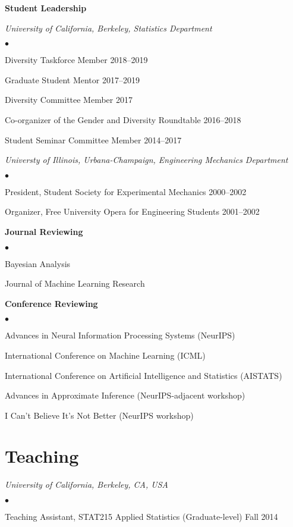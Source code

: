 \documentclass[margin,line]{res}
\newenvironment{list2}{
  \begin{list}{$\bullet$}{%
      \setlength{\itemsep}{0in}
      \setlength{\parsep}{0in} \setlength{\parskip}{0in}
      \setlength{\topsep}{0in} \setlength{\partopsep}{0in}
      \setlength{\leftmargin}{0.2in}}}{\end{list}}
\begin{document}
\begin{resume}
\textbf{Student Leadership}

{\em University of California, Berkeley, Statistics Department}
\begin{list2}
    \item Diversity Taskforce Member \hfill 2018--2019
    \item Graduate Student Mentor \hfill 2017--2019
    \item Diversity Committee Member  \hfill 2017
    \item Co-organizer of the Gender and Diversity Roundtable \hfill 2016--2018
    \item Student Seminar Committee Member \hfill 2014--2017
\end{list2}

{\em Universty of Illinois, Urbana-Champaign, Engineering Mechanics Department}
\begin{list2}
    \item President, Student Society for Experimental Mechanics \hfill 2000--2002
    \item Organizer, Free University Opera for Engineering Students \hfill 2001--2002
\end{list2}


\textbf{Journal Reviewing}
\begin{list2}
\item Bayesian Analysis
\item Journal of Machine Learning Research
\end{list2}

\textbf{Conference Reviewing}
\begin{list2}
\item Advances in Neural Information Processing Systems (NeurIPS)
\item International Conference on Machine Learning (ICML)
\item International Conference on Artificial Intelligence and Statistics (AISTATS)
\item Advances in Approximate Inference (NeurIPS-adjacent workshop)
\item I Can't Believe It's Not Better (NeurIPS workshop)
\end{list2}


\section{\sc Teaching}

\emph{University of California, Berkeley, CA, USA}
\begin{list2}
\item Teaching Assistant, STAT215 Applied Statistics
(Graduate-level) \hfill Fall 2014
\end{list2}


\end{resume}
\end{document}
